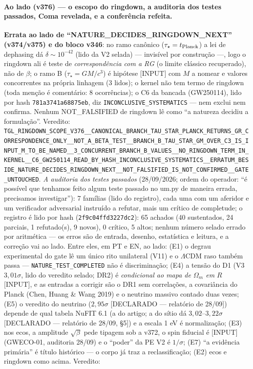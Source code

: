 \documentclass[11pt]{article}
\theoremstyle{definition}\newtheorem{deriv}{Derivação}
\begin{document}
\paragraph*{Ao lado (v376) --- o escopo do ringdown, a auditoria dos testes passados, Coma revelada, e a conferência refeita.} \textbf{Errata ao lado de ``NATURE\_DECIDES\_RINGDOWN\_NEXT'' (v374/v375) e do bloco v346}: no ramo canônico ($\tau_\star=t_{\rm Planck}$) a lei de dephasing dá $\delta\sim10^{-42}$ (lido da V2 selada) --- invisível por construção ---, logo o ringdown ali é teste de \emph{correspondência com a RG} (o limite clássico recuperado), não de $\beta$; o ramo B ($\tau_\star=GM/c^3$) é hipótese \textsf{[INPUT]} com $M$ a nomear e valores concorrentes na própria linhagem (3 lidos); o kernel não tem termo de ringdown (toda menção é comentário: 8 ocorrências); o C6 da bancada (GW250114), lido por hash \texttt{781a3741a68875eb}, diz \texttt{INCONCLUSIVE\_SYSTEMATICS} --- nem exclui nem confirma. Nenhum NOT\_FALSIFIED de ringdown lê como ``a natureza decidiu a formulação''. Veredito: \texttt{TGL\_RINGDOWN\_SCOPE\_V376\_\_CANONICAL\_BRANCH\_TAU\_STAR\_PLANCK\_RETURNS\_GR\_CORRESPONDENCE\_ONLY\_\_NOT\_A\_BETA\_TEST\_\_BRANCH\_B\_TAU\_STAR\_GM\_OVER\_C3\_IS\_INPUT\_M\_TO\_BE\_NAMED\_\_3\_CONCURRENT\_BRANCH\_B\_VALUES\_\_NO\_RINGDOWN\_TERM\_IN\_KERNEL\_\_C6\_GW250114\_READ\_BY\_HASH\_INCONCLUSIVE\_SYSTEMATICS\_\_ERRATUM\_BESIDE\_NATURE\_DECIDES\_RINGDOWN\_NEXT\_\_NOT\_FALSIFIED\_IS\_NOT\_CONFIRMED\_\_GATE\_UNTOUCHED}. \emph{A auditoria dos testes passados} (28/09/2026; ordem do operador: ``é possível que tenhamos feito algum teste passado no um.py de maneira errada, precisamos investigar''): 7 famílias (lido do registro), cada uma com um aferidor e um verificador adversarial instruído a refutar, mais um crítico de completude; o registro é lido por hash (\texttt{2f9c04ffd3227dc2}): 65 achados (40 sustentados, 24 parciais, 1 refutado(s), 9 novos), 0 crítico, 5 altos; nenhum número selado errado por aritmética --- os erros são de entrada, desenho, estatística e leitura, e a correção vai ao lado. Entre eles, em PT e EN, ao lado: (E1) o degrau experimental do gate lê um único rito unilateral (V11) e o $\Lambda$CDM raso também passa --- \texttt{NATURE\_TEST\_COMPLETED} não é discriminação; (E4) a tensão do D1 (V3 $3{,}01\sigma$, lido do veredito selado; DR2) é \emph{condicional ao mapa de $\Omega_m$ em $R$} \textsf{[INPUT]}, e as entradas a corrigir são o DR1 sem correlações, a covariância do Planck (Chen, Huang \& Wang 2019) e o neutrino massivo contado duas vezes; (E5) o veredito do neutrino ($2{,}95\sigma$ \textsf{[DECLARADO --- relatório de 28/09]}) depende de qual tabela NuFIT 6.1 (a do artigo; a do sítio dá $3{,}02$--$3{,}22\sigma$ \textsf{[DECLARADO --- relatório de 28/09, §5]}) e a escala 1 eV é normalização; (E3) nos ecos, a amplitude $\sqrt\beta$ pede tipagem sob a v372, o spin fiducial é \textsf{[INPUT]} (GWECO-01, auditoria 28/09) e o ``poder'' da PE V2 é $1/\sigma$; (E7) ``a evidência primária'' é título histórico --- o corpo já traz a reclassificação; (E2) ecos e ringdown como acima. Veredito: 
\end{document}
